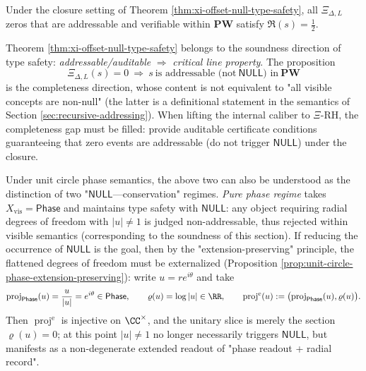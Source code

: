 \begin{corollary}\label{cor:xi-visible-zeros-on-critical-line}
Under the closure setting of Theorem \ref{thm:xi-offset-null-type-safety}, all \(\Xi_{\Delta,L}\) zeros that are addressable and verifiable within \(\mathbf{PW}\) satisfy \(\Re(s)=\tfrac12\).
\end{corollary}

\begin{remark}\label{rem:xi-soundness-vs-completeness}
Theorem \ref{thm:xi-offset-null-type-safety} belongs to the soundness direction of type safety: \emph{addressable/auditable} \(\Rightarrow\) \emph{critical line property}.
The proposition
\[
\Xi_{\Delta,L}(s)=0\ \Longrightarrow\ s\ \text{is addressable (not}\ \mathsf{NULL}\text{) in}\ \mathbf{PW}
\]
is the completeness direction, whose content is not equivalent to "all visible concepts are non-null" (the latter is a definitional statement in the semantics of Section \ref{sec:recursive-addressing}).
When lifting the internal caliber to \(\Xi\)-RH, the completeness gap must be filled: provide auditable certificate conditions guaranteeing that zero events are addressable (do not trigger \(\mathsf{NULL}\)) under the closure.
\par
Under unit circle phase semantics, the above two can also be understood as the distinction of two "\(\mathsf{NULL}\)---conservation" regimes.
\emph{Pure phase regime} takes \(X_{\mathrm{vis}}=\mathsf{Phase}\) and maintains type safety with \(\mathsf{NULL}\): any object requiring radial degrees of freedom with \(|u|\neq 1\) is judged non-addressable, thus rejected within visible semantics (corresponding to the soundness of this section).
If reducing the occurrence of \(\mathsf{NULL}\) is the goal, then by the "extension-preserving" principle, the flattened degrees of freedom must be externalized (Proposition \ref{prop:unit-circle-phase-extension-preserving}): write \(u=re^{i\theta}\) and take
\[
\operatorname{proj}_{\mathsf{Phase}}(u)=\frac{u}{|u|}=e^{i\theta}\in\mathsf{Phase},
\qquad
\varrho(u)=\log|u|\in\RR,
\qquad
\operatorname{proj}^{\mathrm{e}}(u):=\bigl(\operatorname{proj}_{\mathsf{Phase}}(u),\varrho(u)\bigr).
\]
Then \(\operatorname{proj}^{\mathrm{e}}\) is injective on \(\CC^\times\), and the unitary slice is merely the section \(\varrho(u)=0\); at this point \(|u|\neq 1\) no longer necessarily triggers \(\mathsf{NULL}\), but manifests as a non-degenerate extended readout of "phase readout + radial record".

\end{remark}
